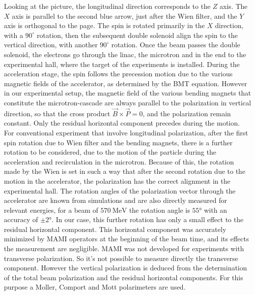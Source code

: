 Looking at the picture, the longitudinal direction corresponds to the $Z$ axis. The $X$ axis is parallel to the second blue arrow, just after the Wien filter, and the $Y$ axis is orthogonal to the page. 
The spin is rotated primarily in the $X$ direction, with a $90^{\circ}$ rotation, then the subsequent double solenoid align the spin to the vertical direction, with another $90^{\circ}$ rotation. 
Once the beam passes the double solenoid, the electrons go through the linac, the microtron and in the end to the experimental hall, where the target of the experiments is installed. During the acceleration stage, the spin follows the precession motion due to the various magnetic fields of the accelerator, as determined by the BMT equation. However in our experimental setup, the magnetic field of the various bending magnets that constitute the microtron-cascade are always parallel to the polarization in vertical direction, so that the cross product $\vec{B} \times \vec{P} = 0$, and the polarization remain constant. Only the residual horizontal component precedes during the motion. For conventional experiment that involve longitudinal polarization, after the first spin rotation due to Wien filter and the bending magnets, there is a further rotation to be considered, due to the motion of the particle during the acceleration and recirculation in the microtron. Because of this, the rotation made by the Wien is set in such a way that after the second rotation due to the motion in the accelerator, the polarization has the correct alignment in the experimental hall. The rotation angles of the polarization vector through the accelerator are known from simulations and are also directly measured for relevant energies, for a beam of $\SI{570}{\mega \electronvolt}$ the rotation angle is $\ang{55}$ with an accuracy of $\pm \ang{2}$. In our case, this further rotation has only a small effect to the residual horizontal component. This horizontal component was accurately minimized by MAMI operators at the beginning of the beam time, and its effects the measurement are negligible. MAMI was not developed for experiments with transverse polarization. So it's not possible to measure directly the transverse component. However the vertical polarization is deduced from the determination of the total beam polarization and the residual horizontal components. For this purpose a Moller, Comport and Mott polarimeters are used.

